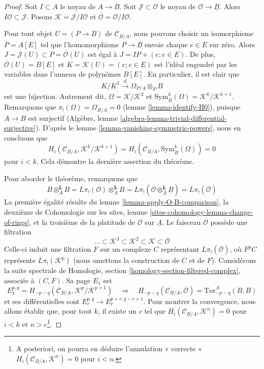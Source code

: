 \begin{proof}
Soit $I \subset A$ le noyau de $A \to B$. Soit
$\mathcal{J} \subset \mathcal{O}$ le noyau de
$\mathcal{O} \to \underline{B}$. Alors
$I\mathcal{O} \subset \mathcal{J}$. Posons
$\mathcal{K} = \mathcal{J}/I\mathcal{O}$ et
$\overline{\mathcal{O}} = \mathcal{O}/I\mathcal{O}$.

\medskip\noindent
Pour tout objet $U = (P \to B)$ de $\mathcal{C}_{B/A}$, nous pouvons choisir
un isomorphisme $P = A[E]$ tel que l'homomorphisme $P \to B$ envoie chaque
$e \in E$ sur zéro. Alors
$J = \mathcal{J}(U) \subset P = \mathcal{O}(U)$
est égal à $J = IP + (e; e \in E)$. De plus,
$\overline{\mathcal{O}}(U) = B[E]$ et $K = \mathcal{K}(U) = (e; e \in E)$
est l'idéal engendré par les variables dans l'anneau de polynômes $B[E]$. En
particulier, il est clair que
$$
K/K^2 \xrightarrow{\text{d}} \Omega_{P/A} \otimes_P B
$$
est une bijection. Autrement dit, $\Omega = \mathcal{K}/\mathcal{K}^2$ et
$\text{Sym}_B^k(\Omega) = \mathcal{K}^k/\mathcal{K}^{k + 1}$. Remarquons que
$\pi_!(\Omega) = \Omega_{B/A} = 0$ (lemme \ref{lemma-identify-H0}), puisque
$A \to B$ est surjectif (Algèbre, lemme
\ref{algebra-lemma-trivial-differential-surjective}). D'après le lemme
\ref{lemma-vanishing-symmetric-powers}, nous en concluons que
$$
H_i(\mathcal{C}_{B/A}, \mathcal{K}^k/\mathcal{K}^{k + 1}) =
H_i(\mathcal{C}_{B/A}, \text{Sym}^k_{\underline{B}}(\Omega)) = 0
$$
pour $i < k$. Cela démontre la dernière assertion du théorème.

\medskip\noindent
Pour aborder le théorème, remarquons que
$$
B \otimes_A^\mathbf{L} B = L\pi_!(\mathcal{O}) \otimes_A^\mathbf{L} B =
L\pi_!(\mathcal{O} \otimes_{\underline{A}}^\mathbf{L} \underline{B}) =
L\pi_!(\overline{\mathcal{O}})
$$
La première égalité résulte du lemme \ref{lemma-apply-O-B-comparison}, la
deuxième de Cohomologie sur les sites, lemme
\ref{sites-cohomology-lemma-change-of-rings}, et la troisième de la platitude
de $\mathcal{O}$ sur $\underline{A}$. Le faisceau
$\overline{\mathcal{O}}$ possède une filtration
$$
\ldots \subset
\mathcal{K}^3 \subset
\mathcal{K}^2 \subset
\mathcal{K} \subset
\overline{\mathcal{O}}
$$
Celle-ci induit une filtration $F$ sur un complexe $C$ représentant
$L\pi_!(\overline{\mathcal{O}})$, où $F^pC$ représente
$L\pi_!(\mathcal{K}^p)$ (nous omettons la construction de $C$ et de $F$).
Considérons la suite spectrale de Homologie, section
\ref{homology-section-filtered-complex}, associée à $(C, F)$. Sa page $E_1$
est
$$
E_1^{p, q} = H_{- p - q}(\mathcal{C}_{B/A}, \mathcal{K}^p/\mathcal{K}^{p + 1})
\quad\Rightarrow\quad
H_{- p - q}(\mathcal{C}_{B/A}, \overline{\mathcal{O}}) = 
\text{Tor}_{- p - q}^A(B, B)
$$
et ses différentielles sont
$E_r^{p, q} \to E_r^{p + r, q - r + 1}$. Pour montrer la convergence, nous
allons établir que, pour tout $k$, il existe un $c$ tel que
$H_i(\mathcal{C}_{B/A}, \mathcal{K}^n) = 0$
pour $i < k$ et $n > c$\footnote{A posteriori, on pourra en déduire
l'annulation « correcte » $H_i(\mathcal{C}_{B/A}, \mathcal{K}^n) = 0$ pour
$i < n$.}.


\end{proof}
